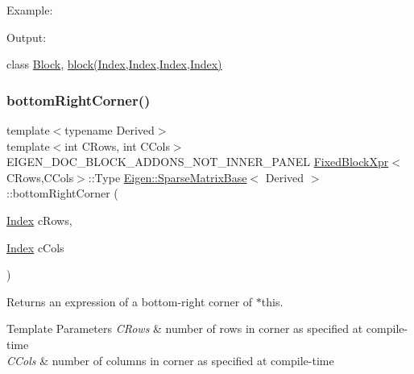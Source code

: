 Example\+: 
\begin{DoxyCodeInclude}{0}
\end{DoxyCodeInclude}
 Output\+: 
\begin{DoxyVerbInclude}
\end{DoxyVerbInclude}
 class \mbox{\hyperlink{class_eigen_1_1_block}{Block}}, \mbox{\hyperlink{class_eigen_1_1_sparse_matrix_base_a7c28a2f511181c727396d5e813519d38}{block(\+Index,\+Index,\+Index,\+Index)}} \mbox{\label{class_eigen_1_1_sparse_matrix_base_a68d2c2489e2f434ad062384eb224ea85}} 
\subsubsection{\texorpdfstring{bottomRightCorner()}{bottomRightCorner()}\hspace{0.1cm}{\footnotesize\ttfamily [3/3]}}
{\footnotesize\ttfamily template$<$typename Derived$>$ \\
template$<$int C\+Rows, int C\+Cols$>$ \\
E\+I\+G\+E\+N\+\_\+\+D\+O\+C\+\_\+\+B\+L\+O\+C\+K\+\_\+\+A\+D\+D\+O\+N\+S\+\_\+\+N\+O\+T\+\_\+\+I\+N\+N\+E\+R\+\_\+\+P\+A\+N\+EL \mbox{\hyperlink{struct_eigen_1_1_sparse_matrix_base_1_1_fixed_block_xpr}{Fixed\+Block\+Xpr}}$<$C\+Rows,C\+Cols$>$\+::Type \mbox{\hyperlink{class_eigen_1_1_sparse_matrix_base}{Eigen\+::\+Sparse\+Matrix\+Base}}$<$ Derived $>$\+::bottom\+Right\+Corner (\begin{DoxyParamCaption}\item[{\mbox{\hyperlink{struct_eigen_1_1_eigen_base_a554f30542cc2316add4b1ea0a492ff02}{Index}}}]{c\+Rows,  }\item[{\mbox{\hyperlink{struct_eigen_1_1_eigen_base_a554f30542cc2316add4b1ea0a492ff02}{Index}}}]{c\+Cols }\end{DoxyParamCaption})\hspace{0.3cm}{\ttfamily [inline]}}

\begin{DoxyReturn}{Returns}
an expression of a bottom-\/right corner of $\ast$this.
\end{DoxyReturn}

\begin{DoxyTemplParams}{Template Parameters}
{\em C\+Rows} & number of rows in corner as specified at compile-\/time \\
\hline
{\em C\+Cols} & number of columns in corner as specified at compile-\/time \\
\hline
\end{DoxyTemplParams}

